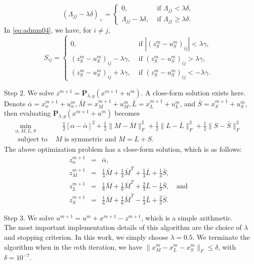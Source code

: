 \documentclass[AMS,STIX1COL]{WileyNJD-v2}
\begin{document}
{$$
(\Lambda_{jj}-\lambda \delta)_+ = \left\{
\begin{array}{ll}
0, & \mbox{ if } \Lambda_{jj} < \lambda \delta, \\
\Lambda_{jj}-\lambda \delta, & \mbox{ if } \Lambda_{jj} \ge \lambda \delta .
\end{array}
\right.
$$
In \eqref{eq:admm04}, we have, for $i \neq j$,
\[
S_{ij} = \left\{
\begin{array}{ll}
0, & \mbox{ if } |(z^m_S - u^m_S)_{ij}| < \lambda \gamma,  \\
(z^m_S - u^m_S)_{ij}-\lambda\gamma , &
\mbox{ if } (z^m_S - u^m_S)_{ij} > \lambda \gamma, \\
(z^m_S - u^m_S)_{ij}+\lambda\gamma , &
\mbox{ if } (z^m_S - u^m_S)_{ij} <- \lambda \gamma.
\end{array}
\right.
\]


\noindent
Step 2. We solve $z^{m+1} = \mathbf{P}_{\lambda,g}(x^{m+1} + u^m)$.
A close-form solution exists here.
Denote
$
\bar{\alpha} = x^{m+1}_\alpha + u^m_\alpha,
\bar{M} = x^{m+1}_M + u^m_M,
\bar{L} = x^{m+1}_L + u^m_L$, and
$\bar{S} = x^{m+1}_S + u^m_S,
$
then evaluating $\mathbf{P}_{\lambda,g}(x^{m+1} + u^m)$ becomes
\begin{eqnarray*}
\min_{\alpha,M,L,S} & \quad
\frac{1}{2}[\alpha - \bar{\alpha}]^2
+ \frac{1}{2}\|M - \bar{M}\|^2_F
+ \frac{1}{2}\|L - \bar{L}\|^2_F
+ \frac{1}{2}\|S - \bar{S}\|^2_F  \\
\mbox{ subject to } & M \mbox{ is symmetric and } M=L+S.
\end{eqnarray*}
The above optimization problem has a close-form solution, which is as follows:
\begin{eqnarray*}
z^{m+1}_\alpha &=& \bar{\alpha}, \\
z^{m+1}_M &=&
\frac{1}{3} \bar{M} + \frac{1}{3} \bar{M}^T + \frac{1}{3} \bar{L} + \frac{1}{3} \bar{S}, \\
z^{m+1}_L &=&
\frac{1}{6} \bar{M} + \frac{1}{6} \bar{M}^T + \frac{2}{3} \bar{L} - \frac{1}{3} \bar{S},
\quad \text{and} \\
z^{m+1}_S &=&
\frac{1}{6} \bar{M} + \frac{1}{6} \bar{M}^T - \frac{1}{3} \bar{L} + \frac{2}{3} \bar{S}.
\end{eqnarray*}

\noindent
Step 3. We solve $u^{m+1} = u^m + x^{m+1} - z^{m+1}$, which is a simple arithmetic. \\

The most important implementation details of this algorithm are the choice of $\lambda$ and stopping criterion.
In this work, we simply choose $\lambda = 0.5$.
We terminate the algorithm  when in the $m$th iteration, we have $\|x^{m}_M - x^{m}_L - x^{m}_S\|_F \leq \delta$, with $\delta=10^{-7}$.

}
\end{document}
